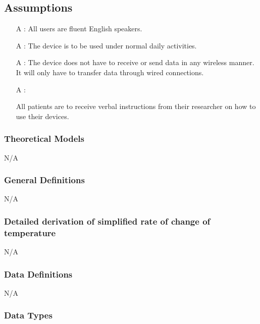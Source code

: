 \documentclass[12pt]{article}
\newcounter{assumpnum} %
\begin{document}
\subsection{Assumptions}%

\begin{itemize}

\item[A\refstepcounter{assumpnum}\theassumpnum
\label{A1}:]
{All users are fluent English speakers.}

\item[A\refstepcounter{assumpnum}\theassumpnum
\label{A2}:]
{The device is to be used under normal daily activities.}

\item[A\refstepcounter{assumpnum}\theassumpnum
\label{A3}:]
{The device does not have to receive or send data in any wireless manner. It will only have to transfer data through wired connections.}

\item[A\refstepcounter{assumpnum}\theassumpnum
\label{A4}:]

{All patients are to receive verbal instructions from their researcher on how to use their devices.}

\end{itemize}


\subsubsection{Theoretical Models}\label{sec_theoretical}
N/A

\subsubsection{General Definitions}\label{sec_gendef}
N/A
\subsubsection*{Detailed derivation of simplified rate of change of temperature}
N/A

\subsubsection{Data Definitions}\label{sec_datadef}
N/A

\subsubsection{Data Types}\label{sec_datatypes}
\end{document}
